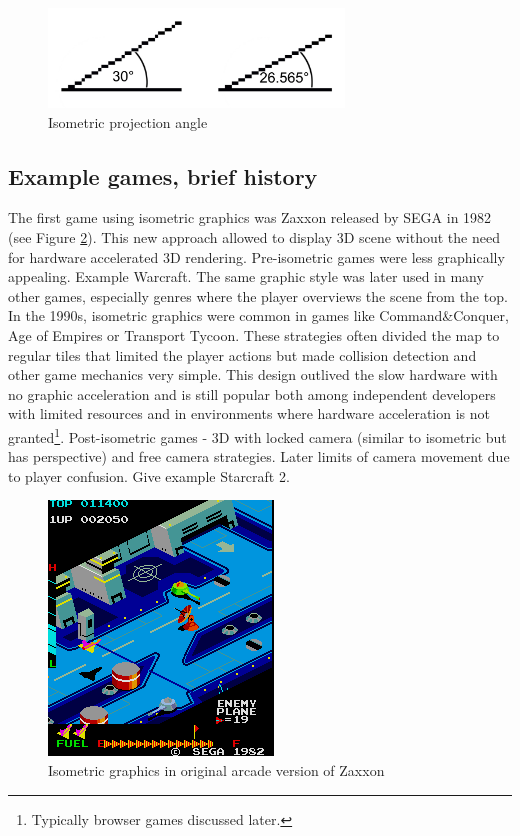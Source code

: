 \documentclass[11pt,oneside, final]{fithesis2}
\begin{document}
\begin{figure}[htp]
	\centering
	\includegraphics[width=0.7\textwidth]{thesis-angles}
	\caption{Isometric projection angle}
	\label{isoangle}
\end{figure}

\subsection{Example games, brief history}
The first game using isometric graphics was Zaxxon released by SEGA in 1982\cite{zaxxon} (see Figure \ref{zaxxon}). This new approach allowed to display 3D scene without the need for hardware accelerated 3D rendering. Pre-isometric games were less graphically appealing. Example Warcraft. The same graphic style was later used in many other games, especially genres where the player overviews the scene from the top. In the 1990s, isometric graphics were common in games like Command\&Conquer\cite{}, Age of Empires or Transport Tycoon\cite{}. These strategies often divided the map to regular tiles that limited the player actions but made collision detection and other game mechanics very simple. This design outlived the slow hardware with no graphic acceleration and is still popular both among independent developers with limited resources and in environments where hardware acceleration is not granted\footnote{Typically browser games discussed later.}. Post-isometric games - 3D with locked camera (similar to isometric but has perspective) and free camera strategies. Later limits of camera movement due to player confusion. Give example Starcraft 2.

\begin{figure}[htp]
	\centering
	\includegraphics{zaxxon}
	\caption{Isometric graphics in original arcade version of Zaxxon\cite{zaxxon}}
	\label{zaxxon}
\end{figure}
\end{document}
